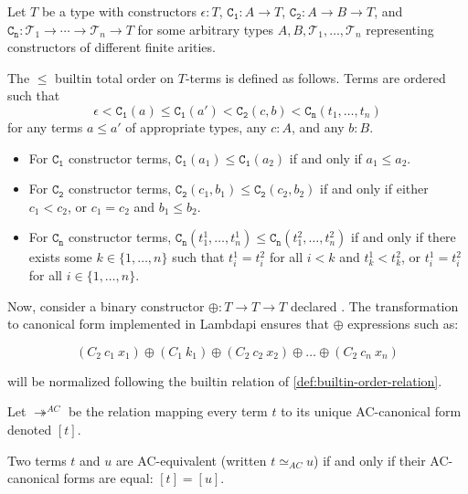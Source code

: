 \begin{definition}\label{def:builtin-order-relation}
Let $T$ be a type with constructors $\epsilon : T$, $\mathtt{C_1} : A \to T$, $\mathtt{C_2} : A \to B \to T$, and $\mathtt{C_n} : \mathcal{T}_1 \to \cdots \to \mathcal{T}_n \to T$ for some arbitrary types $A, B, \mathcal{T}_1, \ldots, \mathcal{T}_n$ representing constructors of different finite arities.

The $\leq$ builtin total order on $T$-terms is defined as follows. Terms are ordered such that
\[
  \epsilon < \mathtt{C_1}(a) \leq \mathtt{C_1}(a') < \mathtt{C_2}(c, b) < \mathtt{C_n}(t_1, \ldots, t_n)
\]
for any terms $a \leq a'$ of appropriate types, any $c : A$, and any $b : B$.

\begin{itemize}
\item For $\mathtt{C_1}$ constructor terms, $\mathtt{C_1}(a_1) \leq \mathtt{C_1}(a_2)$ if and only if $a_1 \leq a_2$.

  \item For $\mathtt{C_2}$ constructor terms, $\mathtt{C_2}(c_1, b_1) \leq \mathtt{C_2}(c_2, b_2)$ if and only if either $c_1 < c_2$, or $c_1 = c_2$ and $b_1 \leq b_2$.

  \item For $\mathtt{C_n}$ constructor terms, $\mathtt{C_n}(t_1^{1}, \ldots, t_n^{1}) \leq \mathtt{C_n}(t_1^{2}, \ldots, t_n^{2})$ if and only if there exists some $k \in \{1, \ldots, n\}$ such that $t_i^{1} = t_i^{2}$ for all $i < k$ and $t_k^{1} < t_k^{2}$, or $t_i^{1} = t_i^{2}$ for all $i \in \{1, \ldots, n\}$.
\end{itemize}
\end{definition}

Now, consider a binary constructor $\oplus: T \to T \to T$ declared .
The transformation to canonical form implemented in Lambdapi ensures that $\oplus$ expressions such as:

\[
  (C_2~c_1~x_1) \oplus (C_1~k_1) \oplus (C_2~c_2~x_2) \oplus \dots \oplus (C_2~c_n~x_n)
\]

will be normalized following the builtin relation of \cref{def:builtin-order-relation}.

\begin{definition}
Let $\twoheadrightarrow^{AC}$ be the relation mapping every term $t$ to its unique AC-canonical form denoted $[t]$.
\end{definition}

\begin{definition}[AC equivalence]
Two terms $t$ and $u$ are AC-equivalent (written $t \simeq_{AC} u$) if and only if their AC-canonical forms are equal: $[t] = [u]$.
\end{definition}

